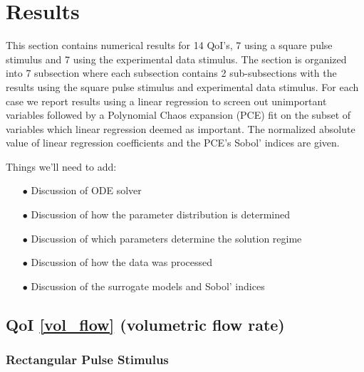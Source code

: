 \documentclass[12pt]{article}
\numberwithin{equation}{section}
\begin{document}
\section{Results}
This section contains numerical results for 14 QoI's, 7 using a square pulse stimulus and 7 using the experimental data stimulus. The section is organized into 7 subsection where each subsection contains 2 sub-subsections with the results using the square pulse stimulus and experimental data stimulus. For each case we report results using a linear regression to screen out unimportant variables followed by a Polynomial Chaos expansion (PCE) fit on the subset of variables which linear regression deemed as important. The normalized absolute value of linear regression coefficients and the PCE's Sobol' indices are given.

Things we'll need to add:
\begin{enumerate}
\item[$\bullet$] Discussion of ODE solver
\item[$\bullet$] Discussion of how the parameter distribution is determined
\item[$\bullet$] Discussion of which parameters determine the solution regime
\item[$\bullet$] Discussion of how the data was processed
\item[$\bullet$] Discussion of the surrogate models and Sobol' indices
\end{enumerate}

\newpage

\subsection{QoI \eqref{vol_flow} (volumetric flow rate)}

\subsubsection{Rectangular Pulse Stimulus}
\end{document}
